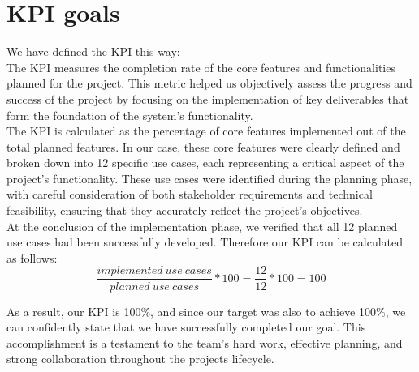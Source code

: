 \documentclass{article}
\begin{document}
\section{KPI goals}
We have defined the KPI this way: \\
The KPI measures the completion rate of the core features and functionalities planned for the project.
This metric helped us objectively assess the progress and success of the project by focusing on the implementation of key deliverables that form the foundation of the system's functionality. \\
The KPI is calculated as the percentage of core features implemented out of the total planned features. In our case, these core features were clearly defined and broken down into 12 specific use cases, each representing a critical aspect of the project's functionality. These use cases were identified during the planning phase, with careful consideration of both stakeholder requirements and technical feasibility, ensuring that they accurately reflect the project's objectives. \\
At the conclusion of the implementation phase, we verified that all 12 planned use cases had been successfully developed. Therefore our KPI can be calculated as follows:
\[ \frac{implemented\ use\ cases}{planned\ use\ cases} * 100 = \frac{12}{12}*100 = 100 \]

As a result, our KPI is 100\%, and since our target was also to achieve 100\%, we can confidently state that we have successfully completed our goal. This accomplishment is a testament to the team's hard work, effective planning, and strong collaboration throughout the projects lifecycle.
\end{document}
